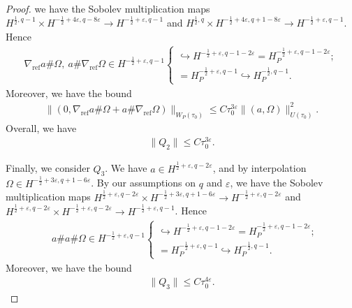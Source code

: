 \documentclass[12pt]{amsart}
\renewcommand{\1}{{\mathbf 1}}
\theoremstyle{others}
\numberwithin{equation}{section}
\newcommand{\inj}{\hookrightarrow}
\begin{document}
\begin{proof}
we have the Sobolev multiplication maps \(H^{\frac{1}{2}, q-1} \times H^{-\frac{1}{2} + 4\varepsilon, q-8\varepsilon} \to H^{-\frac{1}{2} +\varepsilon, q-1}\) and \(H^{\frac{1}{2}, q} \times H^{-\frac{1}{2} + 4\varepsilon, q+1-8\varepsilon} \to H^{-\frac{1}{2} + \varepsilon, q-1}\). Hence
\begin{align*}
    \nabla_{\text{ref}} a \# \Omega, \ a \# \nabla_{\text{ref}} \Omega\in H^{-\frac{1}{2} + \varepsilon, q-1}
    \begin{cases}
        \inj H^{-\frac{1}{2} + \varepsilon, q-1-2\varepsilon} = H_P^{-\frac{1}{2} + \varepsilon, q-1-2\varepsilon}; \\
        = H_P^{-\frac{1}{2} + \varepsilon, q-1} \inj H_P^{-\frac{1}{2}, q-1}.
    \end{cases}
\end{align*} Moreover, we have the bound
\begin{align*}
    \|(0, \nabla_{\text{ref}} a \# \Omega + a \# \nabla_{\text{ref}} \Omega)\|_{W_P(\tau_0)} \leq C\tau_0^{3\varepsilon} \|(a, \Omega)\|_{U(\tau_0)}^2.
\end{align*} Overall, we have
\begin{align*}
    \|Q_2\| \leq C\tau_0^{3\varepsilon}.
\end{align*} \par 
Finally, we consider \(Q_3\). We have \(a \in H^{\frac{1}{2} + \varepsilon, q-2\varepsilon}\), and by interpolation \(\Omega \in H^{-\frac{1}{2} + 3\varepsilon, q + 1 -6\varepsilon}\). By our assumptions on \(q\) and \(\varepsilon\),
 we have the Sobolev multiplication maps \(H^{\frac{1}{2} + \varepsilon, q-2\varepsilon} \times H^{-\frac{1}{2} + 3\varepsilon, q+1-6\varepsilon} \to H^{-\frac{1}{2} + \varepsilon, q-2\varepsilon}\) and \(H^{\frac{1}{2} + \varepsilon, q - 2\varepsilon} \times H^{-\frac{1}{2} + \varepsilon, q-2\varepsilon} \to H^{-\frac{1}{2} + \varepsilon, q - 1}\). Hence
\begin{align*}
    &a \# a \# \Omega \in H^{-\frac{1}{2} + \varepsilon, q-1}
    \begin{cases}
        \inj H^{-\frac{1}{2} + \varepsilon, q-1-2\varepsilon} = H_P^{-\frac{1}{2} + \varepsilon, q - 1 -2\varepsilon} ; \\
        = H_P^{-\frac{1}{2} + \varepsilon, q-1} \inj H_P^{-\frac{1}{2}, q-1}.
    \end{cases}
\end{align*}Moreover, we have the bound 
\begin{align*}
    \|Q_3\| \leq C \tau_0^{4\varepsilon}.

\end{align*}
\end{proof}
\end{document}
